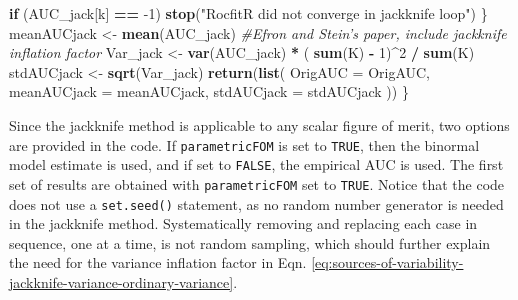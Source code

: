 \documentclass[
]{book}
\newenvironment{Shaded}{\begin{snugshade}}{\end{snugshade}}
\newcommand{\CommentTok}[1]{\textcolor[rgb]{0.56,0.35,0.01}{\textit{#1}}}
\newcommand{\ControlFlowTok}[1]{\textcolor[rgb]{0.13,0.29,0.53}{\textbf{#1}}}
\newcommand{\DataTypeTok}[1]{\textcolor[rgb]{0.13,0.29,0.53}{#1}}
\newcommand{\DecValTok}[1]{\textcolor[rgb]{0.00,0.00,0.81}{#1}}
\newcommand{\KeywordTok}[1]{\textcolor[rgb]{0.13,0.29,0.53}{\textbf{#1}}}
\newcommand{\NormalTok}[1]{#1}
\newcommand{\OperatorTok}[1]{\textcolor[rgb]{0.81,0.36,0.00}{\textbf{#1}}}
\newcommand{\StringTok}[1]{\textcolor[rgb]{0.31,0.60,0.02}{#1}}
\begin{document}
\begin{Shaded}
\begin{Highlighting}[]
    \ControlFlowTok{if}\NormalTok{ (AUC_jack[k] }\OperatorTok{==}\StringTok{ }\DecValTok{-1}\NormalTok{) }
      \KeywordTok{stop}\NormalTok{(}\StringTok{"RocfitR did not converge in jackknife loop"}\NormalTok{) }
\NormalTok{  \}}
\NormalTok{  meanAUCjack <-}\StringTok{ }\KeywordTok{mean}\NormalTok{(AUC_jack)}
  \CommentTok{#Efron and Stein's paper, include jackknife inflation factor}
\NormalTok{  Var_jack <-}\StringTok{ }\KeywordTok{var}\NormalTok{(AUC_jack) }\OperatorTok{*}\StringTok{ }\NormalTok{( }\KeywordTok{sum}\NormalTok{(K) }\OperatorTok{-}\StringTok{ }\DecValTok{1}\NormalTok{)}\OperatorTok{^}\DecValTok{2} \OperatorTok{/}\StringTok{ }\KeywordTok{sum}\NormalTok{(K) }
\NormalTok{  stdAUCjack  <-}\StringTok{ }\KeywordTok{sqrt}\NormalTok{(Var_jack)}
  \KeywordTok{return}\NormalTok{(}\KeywordTok{list}\NormalTok{(}
    \DataTypeTok{OrigAUC =}\NormalTok{ OrigAUC,}
    \DataTypeTok{meanAUCjack =}\NormalTok{ meanAUCjack,}
    \DataTypeTok{stdAUCjack =}\NormalTok{ stdAUCjack}
\NormalTok{  ))}
\NormalTok{\}}
\end{Highlighting}
\end{Shaded}

Since the jackknife method is applicable to any scalar figure of merit, two options are provided in the code. If \texttt{parametricFOM} is set to \texttt{TRUE}, then the binormal model estimate is used, and if set to \texttt{FALSE}, the empirical AUC is used. The first set of results are obtained with \texttt{parametricFOM} set to \texttt{TRUE}. Notice that the code does not use a \texttt{set.seed()} statement, as no random number generator is needed in the jackknife method. Systematically removing and replacing each case in sequence, one at a time, is not random sampling, which should further explain the need for the variance inflation factor in Eqn. \eqref{eq:sources-of-variability-jackknife-variance-ordinary-variance}.
\end{document}
